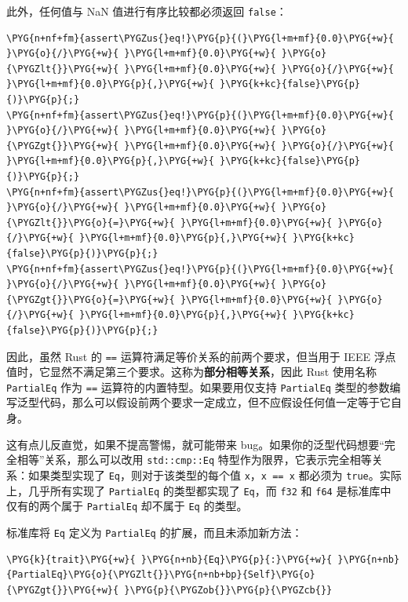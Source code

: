 此外，任何值与 NaN 值进行有序比较都必须返回 \texttt{false}：

\begin{Verbatim}[commandchars=\\\{\},breaklines=true,breakanywhere=true,fontsize=\codefont,xleftmargin=17bp]
\PYG{n+nf+fm}{assert\PYGZus{}eq!}\PYG{p}{(}\PYG{l+m+mf}{0.0}\PYG{+w}{ }\PYG{o}{/}\PYG{+w}{ }\PYG{l+m+mf}{0.0}\PYG{+w}{ }\PYG{o}{\PYGZlt{}}\PYG{+w}{ }\PYG{l+m+mf}{0.0}\PYG{+w}{ }\PYG{o}{/}\PYG{+w}{ }\PYG{l+m+mf}{0.0}\PYG{p}{,}\PYG{+w}{ }\PYG{k+kc}{false}\PYG{p}{)}\PYG{p}{;}
\PYG{n+nf+fm}{assert\PYGZus{}eq!}\PYG{p}{(}\PYG{l+m+mf}{0.0}\PYG{+w}{ }\PYG{o}{/}\PYG{+w}{ }\PYG{l+m+mf}{0.0}\PYG{+w}{ }\PYG{o}{\PYGZgt{}}\PYG{+w}{ }\PYG{l+m+mf}{0.0}\PYG{+w}{ }\PYG{o}{/}\PYG{+w}{ }\PYG{l+m+mf}{0.0}\PYG{p}{,}\PYG{+w}{ }\PYG{k+kc}{false}\PYG{p}{)}\PYG{p}{;}
\PYG{n+nf+fm}{assert\PYGZus{}eq!}\PYG{p}{(}\PYG{l+m+mf}{0.0}\PYG{+w}{ }\PYG{o}{/}\PYG{+w}{ }\PYG{l+m+mf}{0.0}\PYG{+w}{ }\PYG{o}{\PYGZlt{}}\PYG{o}{=}\PYG{+w}{ }\PYG{l+m+mf}{0.0}\PYG{+w}{ }\PYG{o}{/}\PYG{+w}{ }\PYG{l+m+mf}{0.0}\PYG{p}{,}\PYG{+w}{ }\PYG{k+kc}{false}\PYG{p}{)}\PYG{p}{;}
\PYG{n+nf+fm}{assert\PYGZus{}eq!}\PYG{p}{(}\PYG{l+m+mf}{0.0}\PYG{+w}{ }\PYG{o}{/}\PYG{+w}{ }\PYG{l+m+mf}{0.0}\PYG{+w}{ }\PYG{o}{\PYGZgt{}}\PYG{o}{=}\PYG{+w}{ }\PYG{l+m+mf}{0.0}\PYG{+w}{ }\PYG{o}{/}\PYG{+w}{ }\PYG{l+m+mf}{0.0}\PYG{p}{,}\PYG{+w}{ }\PYG{k+kc}{false}\PYG{p}{)}\PYG{p}{;}
\end{Verbatim}

因此，虽然 Rust 的 \texttt{==} 运算符满足等价关系的前两个要求，但当用于 IEEE 浮点值时，它显然不满足第三个要求。这称为\textbf{部分相等关系}，因此 Rust 使用名称 \texttt{PartialEq} 作为 \texttt{==} 运算符的内置特型。如果要用仅支持 \texttt{PartialEq} 类型的参数编写泛型代码，那么可以假设前两个要求一定成立，但不应假设任何值一定等于它自身。

这有点儿反直觉，如果不提高警惕，就可能带来 bug。如果你的泛型代码想要“完全相等”关系，那么可以改用 \texttt{std::cmp::Eq} 特型作为限界，它表示完全相等关系：如果类型实现了 \texttt{Eq}，则对于该类型的每个值 \texttt{x}，\texttt{x == x} 都必须为 \texttt{true}。实际上，几乎所有实现了 \texttt{PartialEq} 的类型都实现了 \texttt{Eq}，而 \texttt{f32} 和 \texttt{f64} 是标准库中仅有的两个属于 \texttt{PartialEq} 却不属于 \texttt{Eq} 的类型。

标准库将 \texttt{Eq} 定义为 \texttt{PartialEq} 的扩展，而且未添加新方法：

\begin{Verbatim}[commandchars=\\\{\},breaklines=true,breakanywhere=true,fontsize=\codefont,xleftmargin=17bp]
\PYG{k}{trait}\PYG{+w}{ }\PYG{n+nb}{Eq}\PYG{p}{:}\PYG{+w}{ }\PYG{n+nb}{PartialEq}\PYG{o}{\PYGZlt{}}\PYG{n+nb+bp}{Self}\PYG{o}{\PYGZgt{}}\PYG{+w}{ }\PYG{p}{\PYGZob{}}\PYG{p}{\PYGZcb{}}
\end{Verbatim}

